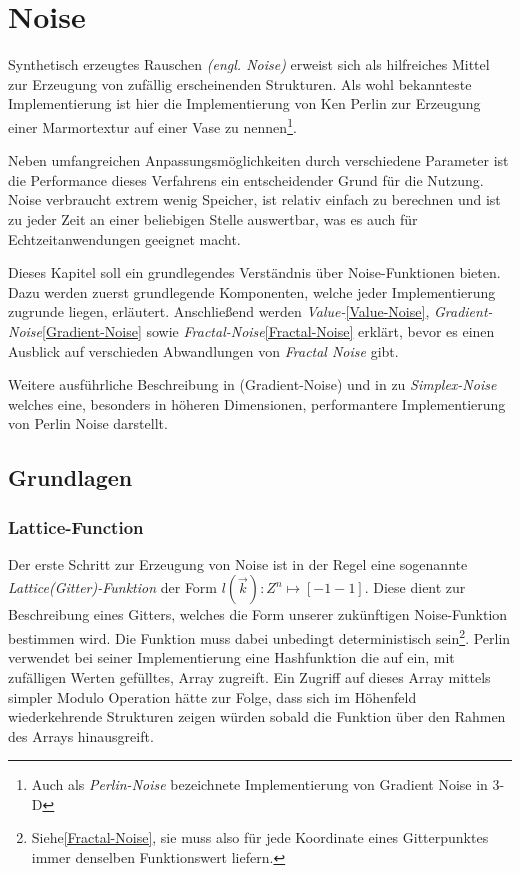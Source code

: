 \chapter{Noise}\label{Noise}
Synthetisch erzeugtes Rauschen \emph{(engl. Noise)} erweist sich als hilfreiches Mittel zur Erzeugung von zufällig erscheinenden Strukturen.
Als wohl bekannteste Implementierung ist hier die Implementierung von Ken Perlin\cite{PERLIN1985} zur Erzeugung einer Marmortextur auf einer Vase zu nennen\footnote{Auch als \emph{Perlin-Noise} bezeichnete Implementierung von Gradient Noise in 3-D}.

Neben umfangreichen Anpassungsmöglichkeiten durch verschiedene Parameter ist die Performance dieses Verfahrens ein entscheidender Grund für die Nutzung. Noise verbraucht extrem wenig Speicher, ist relativ einfach zu berechnen und ist zu jeder Zeit an einer beliebigen Stelle auswertbar, was es auch für Echtzeitanwendungen geeignet macht.\cite{H.Hauser2010}

Dieses Kapitel soll ein grundlegendes Verständnis über Noise-Funktionen bieten. Dazu werden zuerst grundlegende Komponenten, welche jeder Implementierung zugrunde liegen, erläutert. Anschließend werden \emph{Value-}\ref{Value-Noise}, \emph{Gradient-Noise}\ref{Gradient-Noise} sowie \emph{Fractal-Noise}\ref{Fractal-Noise} erklärt, bevor es einen Ausblick auf verschieden Abwandlungen von \emph{Fractal Noise} gibt.

Weitere ausführliche Beschreibung in \cite{BurgerGradientNoise2008} (Gradient-Noise) und in \cite{simplexNoise} zu \emph{Simplex-Noise} welches eine, besonders in höheren Dimensionen, performantere Implementierung von Perlin Noise darstellt.

\section{Grundlagen}
\subsection{Lattice-Function}\label{latticeFunc}
Der erste Schritt zur Erzeugung von Noise ist in der Regel eine sogenannte \emph{Lattice(Gitter)-Funktion}\cite{fractalsAndChaos} der Form \begin{math}l(\vec{k}): {Z}^n \mapsto [-1 - 1]\end{math}\label{latticeFunc}.
Diese dient zur Beschreibung eines Gitters, welches die Form unserer zukünftigen Noise-Funktion bestimmen wird. Die Funktion muss dabei unbedingt deterministisch sein\footnote{Siehe\ref{Fractal-Noise}, sie muss also für jede Koordinate eines Gitterpunktes immer denselben Funktionswert liefern.}. Perlin verwendet bei seiner Implementierung eine Hashfunktion die auf ein, mit zufälligen Werten gefülltes, Array zugreift. Ein Zugriff auf dieses Array mittels simpler Modulo Operation hätte zur Folge, dass sich im Höhenfeld wiederkehrende Strukturen zeigen würden sobald die Funktion über den Rahmen des Arrays hinausgreift.


